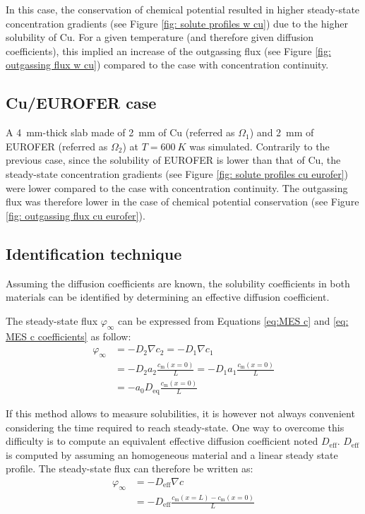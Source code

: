 In this case, the conservation of chemical potential resulted in higher steady-state concentration gradients (see Figure \ref{fig: solute profiles w cu}) due to the higher solubility of Cu.
For a given temperature (and therefore given diffusion coefficients), this implied an increase of the outgassing flux (see Figure \ref{fig: outgassing flux w cu}) compared to the case with concentration continuity.

\subsection{Cu/EUROFER case}

A \SI{4}{mm}-thick slab made of \SI{2}{mm} of Cu (referred as $\Omega_1$) and \SI{2}{mm} of EUROFER (referred as $\Omega_2$) at $T=\SI{600}{K}$ was simulated.
Contrarily to the previous case, since the solubility of EUROFER is lower than that of Cu, the steady-state concentration gradients (see Figure \ref{fig: solute profiles cu eurofer}) were lower compared to the case with concentration continuity.
The outgassing flux was therefore lower in the case of chemical potential conservation (see Figure \ref{fig: outgassing flux cu eurofer}).



\subsection{Identification technique}
Assuming the diffusion coefficients are known, the solubility coefficients in both materials can be identified by determining an effective diffusion coefficient.

The steady-state flux $\varphi_\infty$ can be expressed from Equations \ref{eq:MES c} and \ref{eq: MES c coefficients} as follow:
\begin{subequations}
    \begin{align}
        \varphi_\infty &= -D_2 \nabla c_2 =  -D_1 \nabla c_1 \\
        &= -D_2 a_2 \frac{c_\mathrm{m}(x=0)}{L} = -D_1 a_1 \frac{c_\mathrm{m}(x=0)}{L}\\
        &= -a_0 D_\mathrm{eq} \frac{c_\mathrm{m}(x=0)}{L}
    \end{align}
    \label{eq: steady state flux 1}
\end{subequations}

If this method allows to measure solubilities, it is however not always convenient considering the time required to reach steady-state.
One way to overcome this difficulty is to compute an equivalent effective diffusion coefficient noted $D_\mathrm{eff}$.
$D_\mathrm{eff}$ is computed by assuming an homogeneous material and a linear steady state profile.
The steady-state flux can therefore be written as:
\begin{subequations}
    \begin{align}
        \varphi_\infty &= -D_\mathrm{eff} \nabla c \\
        &= -D_\mathrm{eff} \frac{c_\mathrm{m}(x=L) - c_\mathrm{m}(x=0)}{L} \\
    \end{align}
    \label{eq: steady state flux 2}
\end{subequations}

